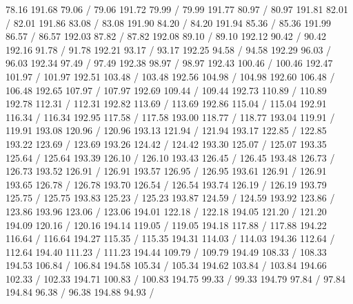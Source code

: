 { 78.16 191.68 79.06 /
 79.06 191.72 79.99 /
 79.99 191.77 80.97 /
 80.97 191.81 82.01 /
 82.01 191.86 83.08 /
 83.08 191.90 84.20 /
 84.20 191.94 85.36 /
 85.36 191.99 86.57 /
 86.57 192.03 87.82 /
 87.82 192.08 89.10 /
 89.10 192.12 90.42 /
 90.42 192.16 91.78 /
 91.78 192.21 93.17 /
 93.17 192.25 94.58 /
 94.58 192.29 96.03 /
 96.03 192.34 97.49 /
 97.49 192.38 98.97 /
 98.97 192.43 100.46 /
 100.46 192.47 101.97 /
 101.97 192.51 103.48 /
 103.48 192.56 104.98 /
 104.98 192.60 106.48 /
 106.48 192.65 107.97 /
 107.97 192.69 109.44 /
 109.44 192.73 110.89 /
 110.89 192.78 112.31 /
 112.31 192.82 113.69 /
 113.69 192.86 115.04 /
 115.04 192.91 116.34 /
 116.34 192.95 117.58 /
 117.58 193.00 118.77 /
 118.77 193.04 119.91 /
 119.91 193.08 120.96 /
 120.96 193.13 121.94 /
 121.94 193.17 122.85 /
 122.85 193.22 123.69 /
 123.69 193.26 124.42 /
 124.42 193.30 125.07 /
 125.07 193.35 125.64 /
 125.64 193.39 126.10 /
 126.10 193.43 126.45 /
 126.45 193.48 126.73 /
 126.73 193.52 126.91 /
 126.91 193.57 126.95 /
 126.95 193.61 126.91 /
 126.91 193.65 126.78 /
 126.78 193.70 126.54 /
 126.54 193.74 126.19 /
 126.19 193.79 125.75 /
 125.75 193.83 125.23 /
 125.23 193.87 124.59 /
 124.59 193.92 123.86 /
 123.86 193.96 123.06 /
 123.06 194.01 122.18 /
 122.18 194.05 121.20 /
 121.20 194.09 120.16 /
 120.16 194.14 119.05 /
 119.05 194.18 117.88 /
 117.88 194.22 116.64 /
 116.64 194.27 115.35 /
 115.35 194.31 114.03 /
 114.03 194.36 112.64 /
 112.64 194.40 111.23 /
 111.23 194.44 109.79 /
 109.79 194.49 108.33 /
 108.33 194.53 106.84 /
 106.84 194.58 105.34 /
 105.34 194.62 103.84 /
 103.84 194.66 102.33 /
 102.33 194.71 100.83 /
 100.83 194.75 99.33 /
 99.33 194.79 97.84 /
 97.84 194.84 96.38 /
 96.38 194.88 94.93 /
}
